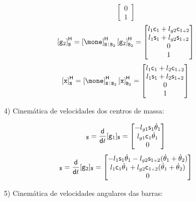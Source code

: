 \documentclass[a4paper,11pt,brazil,fleqn]{article}
\begin{document}
\begin{itemize}
\begin{equation}
\begin{bmatrix}
0 \\
1
\end{bmatrix}
\end{equation}
\begin{equation}
\hvct{\ttg_2}_{\ttN}  = \hvct{\mone}_{\ttN \rl \ttB_2} \hvct{\ttg_2}_{\ttB_2} =
\begin{bmatrix}
l_1 \ccos_1 + l_{g2} \ccos_{1\plus 2} \\
l_1 \ssin_1 + l_{g2} \ssin_{1\plus 2} \\
0 \\
1
\end{bmatrix}
\end{equation}
\begin{equation}
\hvct{\ttx}_{\ttN}  = \hvct{\mone}_{\ttN \rl \ttB_2} \hvct{\ttx}_{\ttB_2} =
\begin{bmatrix}
l_1 \ccos_1 + l_2 \ccos_{1\plus 2} \\
l_1 \ssin_1 + l_2 \ssin_{1\plus 2} \\
0 \\
1
\end{bmatrix}
\end{equation}

\item[4)] Cinem\'atica de velocidades dos centros de massa:

\begin{equation}
[\underline{\vv}_1]_{\ttN} = \frac{\dd}{\dd t} [\ttg_1]_\ttN =
\begin{bmatrix}
-l_{g1} \ssin_1 \dot{\theta}_1 \\
 l_{g1} \ccos_1 \dot{\theta}_1 \\
 0 \\
\end{bmatrix}
\end{equation}
\begin{equation}
[\underline{\vv}_2]_{\ttN} = \frac{\dd}{\dd t} [\ttg_2]_\ttN =
\begin{bmatrix}
-l_{1} \ssin_1 \dot{\theta}_1 - l_{g2} \ssin_{1\plus 2} ( \dot{\theta}_1 + \dot{\theta}_2 )\\
 l_{1} \ccos_1 \dot{\theta}_1 + l_{g2} \ccos_{1\plus 2} ( \dot{\theta}_1 + \dot{\theta}_2 )\\
 0 \\
\end{bmatrix}
\end{equation}

\item[5)] Cinem\'atica de velocidades angulares das barras:


\end{itemize}
\end{document}
